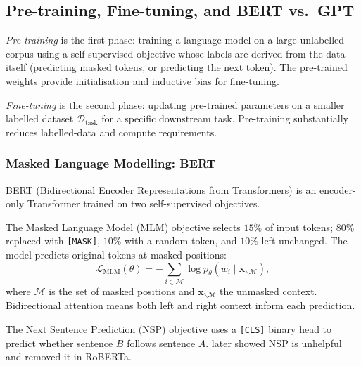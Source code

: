 \begin{deepdive}
\subsection{Pre-training, Fine-tuning, and BERT vs.\ GPT}
\label{sec:transformer-pretrain}

\begin{definition}
\label{def:pretraining}
\emph{Pre-training} is the first phase: training a language model on a large
unlabelled corpus using a self-supervised objective whose labels are derived from
the data itself (predicting masked tokens, or predicting the next token).
The pre-trained weights provide initialisation and inductive bias for fine-tuning.
\end{definition}

\begin{definition}
\label{def:finetuning}
\emph{Fine-tuning} is the second phase: updating pre-trained parameters on a smaller
labelled dataset $\mathcal{D}_{\mathrm{task}}$ for a specific downstream task.
Pre-training substantially reduces labelled-data and compute requirements.
\end{definition}

\subsubsection{Masked Language Modelling: BERT}

BERT \cite{devlin2019} %
(Bidirectional Encoder Representations from Transformers) is an encoder-only
Transformer trained on two self-supervised objectives.

The Masked Language Model (MLM) objective selects $15\%$ of input tokens; $80\%$ replaced with \texttt{[MASK]},
$10\%$ with a random token, and $10\%$ left unchanged.
The model predicts original tokens at masked positions:
\begin{equation}
  \mathcal{L}_{\mathrm{MLM}}(\theta)
  = -\sum_{i \in \mathcal{M}}
    \log p_\theta\!\left(w_i \mid \mathbf{x}_{\backslash \mathcal{M}}\right),
  \label{eq:mlm-loss}
\end{equation}
where $\mathcal{M}$ is the set of masked positions and
$\mathbf{x}_{\backslash\mathcal{M}}$ the unmasked context.
Bidirectional attention means both left and right context inform each prediction.

The Next Sentence Prediction (NSP) objective uses a \texttt{[CLS]} binary head to predict whether sentence $B$ follows sentence $A$.
\citet{liu2019roberta} %
later showed NSP is unhelpful and removed it in RoBERTa.


\end{deepdive}
